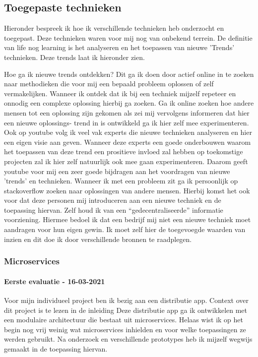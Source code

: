 \subsection{Toegepaste technieken}\label{subsec:toegepaste-technieken}
Hieronder bespreek ik hoe ik verschillende technieken heb onderzocht en toegepast.
Deze technieken waren voor mij nog van onbekend terrein.
De definitie van life nog learning is het analyseren en het toepassen van nieuwe 'Trends' technieken.
Deze trends laat ik hieronder zien.

Hoe ga ik nieuwe trends ontdekken?
Dit ga ik doen door actief online in te zoeken naar methodieken die voor mij een bepaald probleem oplossen of zelf
vermakelijken.
Wanneer ik ontdek dat ik bij een techniek mijzelf repeteer en onnodig een complexe oplossing hierbij ga zoeken.
Ga ik online zoeken hoe andere mensen tot een oplossing zijn gekomen als zei mij vervolgens informeren dat hier een
nieuwe oplossings- trend in is ontwikkeld ga ik hier zelf mee experimenteren.
Ook op youtube volg ik veel vak experts die nieuwe technieken analyseren en hier een eigen visie aan geven.
Wanneer deze experts een goede onderbouwen waarom het toepassen van deze trend een prositieve invloed zal hebben op
toekomstige projecten zal ik hier zelf natuurlijk ook mee gaan experimenteren.
Daarom geeft youtube voor mij een zeer goede bijdragen aan het voordragen van nieuwe 'trends' en technieken.
Wanneer ik met een probleem zit ga ik persoonlijk op stackoverflow zoeken naar oplossingen van andere mensen.
Hierbij komst het ook voor dat deze personen mij introduceren aan een nieuwe techniek en de toepassing hiervan.
Zelf houd ik van een “gedecentraliseerde” informatie voorziening.
Hiermee bedoel ik dat een bedrijf mij niet een nieuwe techniek moet aandragen voor hun eigen gewin.
Ik moet zelf hier de toegevoegde waarden van inzien en dit doe ik door verschillende bronnen te raadplegen.


\subsubsection{Microservices}
\paragraph{Eerste evaluatie - 16-03-2021}
Voor mijn individueel project ben ik bezig aan een distributie app.
Context over dit project is te lezen in de inleiding
Deze distributie app ga ik ontwikkelen met een modulaire architectuur die bestaat uit microservices.
Helaas wist ik op het begin nog vrij weinig wat microservices inhielden en voor welke toepassingen ze werden gebruikt.
Na onderzoek en verschillende prototypes heb ik mijzelf wegwijs gemaakt in de toepassing hiervan.

